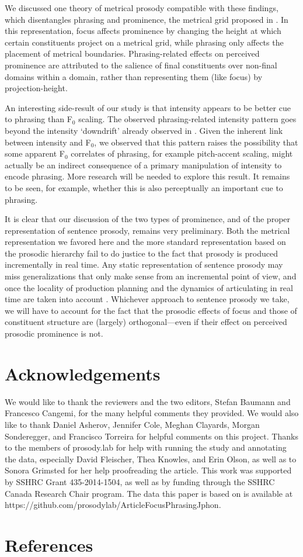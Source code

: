 \documentclass[preprint,review,12pt,authoryear,times]{elsarticle}
\begin{document}
We discussed one theory of metrical prosody compatible with these findings, which disentangles phrasing and prominence, the metrical grid proposed in \citet{wagner05recursion}. In this representation, focus affects prominence by changing the height at which certain constituents project on a metrical grid, while phrasing only affects the placement of metrical boundaries. Phrasing-related effects on perceived prominence are attributed to the salience of final constituents over non-final domains within a domain, rather than representing them (like focus) by projection-height. 

An interesting side-result of our study is that intensity appears to be better cue to phrasing than F$_0$ scaling. The observed phrasing-related intensity pattern goes beyond the intensity `downdrift' already observed in \citet{pierr79}.  Given the inherent link between intensity and F$_0$, we observed that this pattern raises the possibility that some apparent F$_0$ correlates of phrasing, for example pitch-accent scaling, might actually be an indirect consequence of a primary manipulation of intensity to encode phrasing. More research will be needed to explore this result. It remains to be seen, for example, whether this is also perceptually an important cue to phrasing.

It is clear that our discussion of the two types of prominence, and of the proper representation of sentence prosody, remains very preliminary. Both the metrical representation we favored here and the more standard representation based on the prosodic hierarchy fail to do justice to the fact that prosody is produced incrementally in real time. Any static representation of sentence prosody may miss generalizations that only make sense from an incremental point of view, and once the locality of production planning \citep[cf.][]{keati02} and the dynamics of articulating in real time are taken into account \citep[cf.][]{mucke14}. Whichever approach to sentence prosody we take, we will have to account for the fact that the prosodic effects of focus and those of constituent structure are (largely) orthogonal---even if their effect on perceived prosodic prominence is not.


\section*{Acknowledgements}

We would like to thank the reviewers and the two editors, Stefan Baumann and Francesco Cangemi, for the many helpful comments they provided. We  would also like to thank Daniel Asherov, Jennifer Cole, Meghan Clayards, Morgan Sonderegger, and Francisco Torreira for helpful comments on this project. Thanks to the members of prosody.lab for help with running the study and annotating the data, especially David Fleischer, Thea Knowles,  and Erin Olson, as well as to Sonora Grimsted for her help proofreading the article. This work was supported by SSHRC Grant 435-2014-1504, as well as by funding through the SSHRC Canada Research Chair program. The data this paper is based on is available at https://github.com/prosodylab/ArticleFocusPhrasingJphon.


\section*{References}

%

\end{document}
